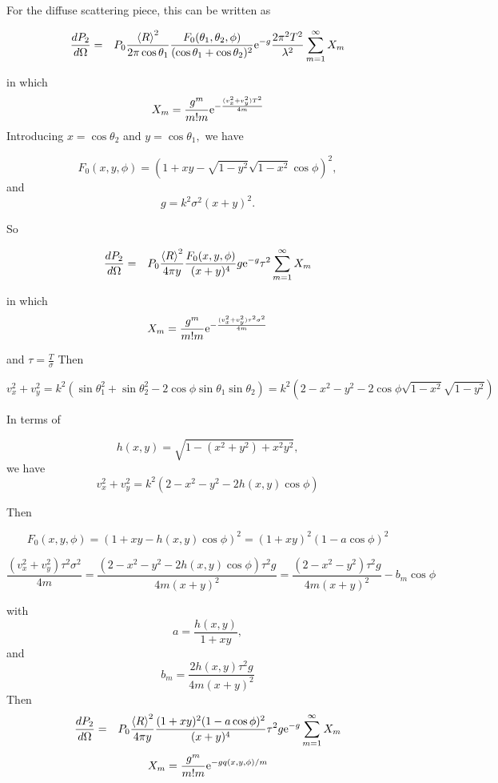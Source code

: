 \documentclass[11pt]{article}
\newcommand{\der}[2]{\frac{d {#1}}{d {#2}}}
\newcommand{\e}{{\rm e}}
\begin{document}
{{{{For the diffuse scattering piece, this can be written as

\begin{eqnarray}
\der{P_{2}}{\Omega}&=&P_{0}\frac{\left<R\right>^{2}}{2\pi\cos\theta_{1}}\frac{F_{0}(\theta_{1},\theta_{2},\phi)}{(\cos{\theta_{1}}+\cos{\theta_{2}})^{2}}\e^{-g}\frac{2\pi^{2}T^{2}}{\lambda^{2}}\sum_{m=1}^{\infty}X_{m}\end{eqnarray}

in which
$$X_{m}=\frac{g^{m}}{m!m}\e^{-\frac{(v_{x}^{2}+v_{y}^{2})T^{2}}{4m}}$$
Introducing $x=\cos\theta_{2}$ and $y=\cos\theta_{1},$ we have

$$F_{0}(x,y,\phi)=\left(1+xy-\sqrt{1-y^{2}}\sqrt{1-x^{2}}\cos\phi\right)^{2},$$
and
$$g=k^{2}\sigma^{2}(x+y)^{2}.$$

So

\begin{eqnarray}
\der{P_{2}}{\Omega}&=&P_{0}\frac{\left<R\right>^{2}}{4\pi y}\frac{F_{0}(x,y,\phi)}{(x+y)^{4}}g\e^{-g}\tau^{2}\sum_{m=1}^{\infty}X_{m}\end{eqnarray}

in which
$$X_{m}=\frac{g^{m}}{m!m}\e^{-\frac{(v_{x}^{2}+v_{y}^{2})\tau^{2}\sigma^{2}}{4m}}$$

and $\tau=\frac{T}{\sigma}$
Then

$$v_{x}^{2}+v_{y}^{2}=k^{2}\left(\sin\theta_{1}^{2}+\sin\theta_{2}^{2}-2\cos\phi\sin\theta_{1}\sin\theta_{2}\right)=k^{2}\left(2-x^{2}-y^{2}-2\cos\phi\sqrt{1-x^{2}}\sqrt{1-y^{2}}\right)$$

In terms of 

$$h(x,y)=\sqrt{1-(x^{2}+y^{2})+x^{2}y^{2}},$$
we have
$$v_{x}^{2}+v_{y}^{2}=k^{2}\left(2-x^{2}-y^{2}-2h(x,y)\cos\phi\right)$$

Then

$$F_{0}(x,y,\phi)=\left(1+xy-h(x,y)\cos\phi\right)^{2}=(1+xy)^{2}(1-a\cos\phi)^{2}$$

$$\frac{(v_{x}^{2}+v_{y}^{2})\tau^{2}\sigma^{2}}{4m}=\frac{\left(2-x^{2}-y^{2}-2h(x,y)\cos\phi\right)\tau^{2}g}{4m(x+y)^{2}}=\frac{\left(2-x^{2}-y^{2}\right)\tau^{2}g}{4m(x+y)^{2}}-b_{m}\cos\phi$$

with
$$a=\frac{h(x,y)}{1+xy},$$
and
$$b_{m}=\frac{2h(x,y)\tau^{2}g}{4m(x+y)^{2}}$$
Then
\begin{eqnarray}\der{P_{2}}{\Omega}&=&P_{0}\frac{\left<R\right>^{2}}{4\pi y}\frac{(1+xy)^{2}(1-a\cos\phi)^{2}}{(x+y)^{4}}\tau^{2}g\e^{-g}\sum_{m=1}^{\infty}X_{m}\end{eqnarray}
$$X_{m}=\frac{g^{m}}{m!m}\e^{-gq(x,y,\phi)/m}$$

}}}}
\end{document}
